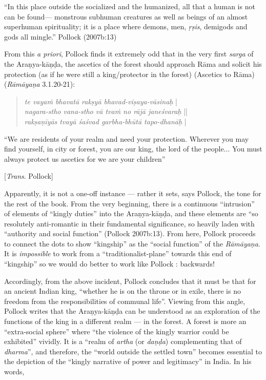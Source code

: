 \newpage

\begin{myquote}
“In this place outside the socialized and the humanized, all that a human is not can be found--- monstrous subhuman creatures as well as beings of an almost superhuman spirituality; it is a place where demons, men, {\sl ṛṣis}, demigods and gods all mingle.”
\hfill	 Pollock (2007b:13)
\end{myquote}

From this {\sl a priori}, Pollock finds it extremely odd that in the very first {\sl sarga} of the Araṇya-kāṇḍa, the ascetics of the forest should approach Rāma and solicit his protection (as if he were still a king/protector in the forest)  (Ascetics to Rāma) ({\sl Rāmāyaṇa} 3.1.20-21):
\begin{quote}
{{\sl te vayaṁ bhavatā rakṣyā bhavad-viṣaya-vāsinaḥ}}\label{verse34} |\\
{\sl nagara-stho vana-stho vā tvaṁ no rājā janeśvaraḥ} ||\\
{\sl rakṣaṇīyās tvayā śaśvad garbha-bhūtā tapo-dhanāḥ}\label{verse35} |
\end{quote}

\begin{myquote}
“We are residents of your realm and need your protection. Wherever you may find yourself, in city or forest, you are our king, the lord of the people... You must always protect us ascetics for we are your children” 

\hfill[{\sl Trans}. Pollock]
\end{myquote}

Apparently, it is not a one-off instance --- rather it sets, says Pollock, the tone for the rest of the book. From the very beginning, there is a continuous “intrusion” of elements of “kingly duties” into the Araṇya-kāṇḍa, and these elements are “so resolutely anti-romantic in their fundamental significance, so heavily laden with “authority and social function” (Pollock 2007b:13). From here, Pollock proceeds to connect the dots to show “kingship” as the “social function” of the {\sl Rāmāyaṇa}.  It is {\sl impossible} to work from a “traditionalist-plane” towards this end of “kingship” so we would do better to work like Pollock : backwards!

Accordingly, from the above incident, Pollock concludes that it must be that for an ancient Indian king, “whether he is on the throne or in exile, there is no freedom from the responsibilities of communal life”.  Viewing from this angle, Pollock writes that the Araṇya-kāṇḍa can be understood as an exploration of the functions of the king in a different realm --- in the forest. A forest is more an “extra-social sphere” where “the violence of the kingly warrior could be exhibited” vividly. It is a “realm of {\sl artha} (or {\sl daṇḍa}) complementing that of {\sl dharma}”, and therefore, the “world outside the settled town” becomes essential to the depiction of the “kingly narrative of power and legitimacy” in India. In his words, 

